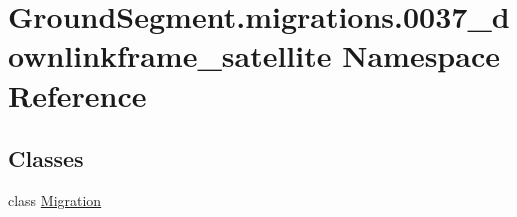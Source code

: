 \hypertarget{namespace_ground_segment_1_1migrations_1_10037__downlinkframe__satellite}{}\section{Ground\+Segment.\+migrations.0037\+\_\+downlinkframe\+\_\+satellite Namespace Reference}
\label{namespace_ground_segment_1_1migrations_1_10037__downlinkframe__satellite}
\subsection*{Classes}
\begin{DoxyCompactItemize}
\item 
class \hyperlink{class_ground_segment_1_1migrations_1_10037__downlinkframe__satellite_1_1_migration}{Migration}
\end{DoxyCompactItemize}
